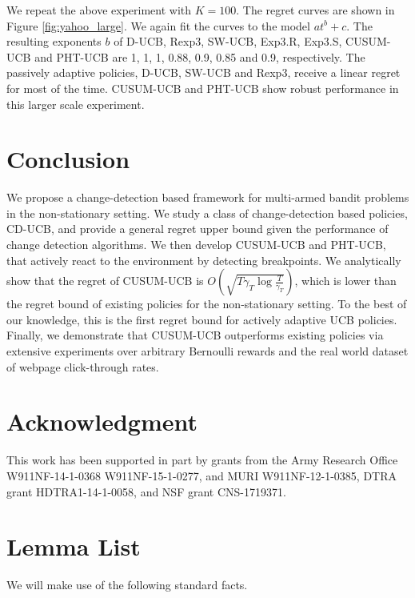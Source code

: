 \documentclass[letterpaper]{article} %
\newcommand{\green}{}
\begin{document}
{\green
{}
We repeat the above experiment with $K=100$. The regret curves are shown in Figure \ref{fig:yahoo_large}. We again fit the curves to the model $at^b+c$. The resulting exponents $b$ of D-UCB, Rexp3, SW-UCB, Exp3.R, Exp3.S, CUSUM-UCB and PHT-UCB are 1, 1, 1, 0.88, 0.9, 0.85 and 0.9, respectively. The passively adaptive policies, D-UCB, SW-UCB and Rexp3, receive
a linear regret for most of the time. CUSUM-UCB and PHT-UCB show robust performance in this larger scale experiment.
}
\section{Conclusion}\label{sec:conclusion}
We propose a change-detection based framework for multi-armed bandit
problems in the non-stationary setting. We study a class of
change-detection based policies, CD-UCB, and provide a general regret
upper bound given the performance of change detection algorithms. We
then develop CUSUM-UCB and PHT-UCB, that actively react to the environment by
detecting breakpoints. 
We analytically show that the regret of CUSUM-UCB is
$O(\sqrt{T\gamma_T\log{\frac{T}{\gamma_T}}})$, which is lower than the
regret bound of existing policies for the non-stationary setting.
To the best of our knowledge, this is the first regret bound for
actively adaptive UCB policies.
Finally, we demonstrate that CUSUM-UCB outperforms existing policies
via extensive experiments over arbitrary Bernoulli rewards and the
real world dataset of webpage click-through rates.

\section*{Acknowledgment}
This work has been supported in part by grants  from the Army Research Office  W911NF-14-1-0368 W911NF-15-1-0277, and MURI W911NF-12-1-0385, DTRA grant HDTRA1-14-1-0058, and NSF grant CNS-1719371.



\newpage
\appendix
\section{Lemma List}
We will make use of the following standard facts.
\end{document}
